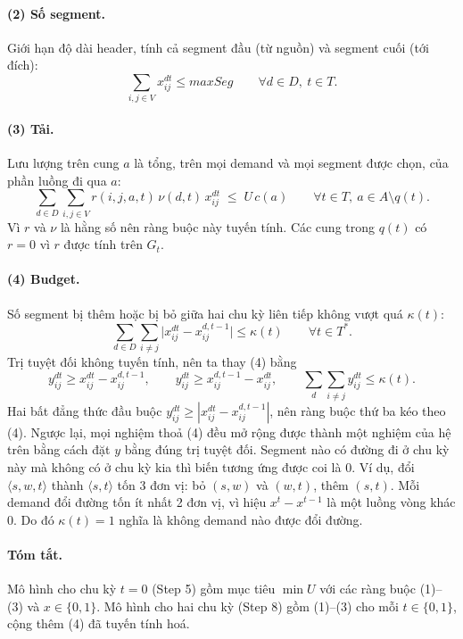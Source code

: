 \documentclass[11pt,a4paper]{article}
\begin{document}
\paragraph{(2) Số segment.} Giới hạn độ dài header, tính cả segment đầu (từ nguồn) và segment cuối (tới đích):
\begin{equation}
\sum_{i,j\in V} x^{dt}_{ij}\le maxSeg\qquad\forall d\in D,\ t\in T.
\end{equation}

\paragraph{(3) Tải.} Lưu lượng trên cung $a$ là tổng, trên mọi demand và mọi segment được chọn, của phần luồng đi qua $a$:
\begin{equation}
\sum_{d\in D}\sum_{i,j\in V} r(i,j,a,t)\,\nu(d,t)\,x^{dt}_{ij}\;\le\; U\,c(a)\qquad\forall t\in T,\ a\in A\setminus q(t).
\end{equation}
Vì $r$ và $\nu$ là hằng số nên ràng buộc này tuyến tính.
Các cung trong $q(t)$ có $r=0$ vì $r$ được tính trên $G_t$.

\paragraph{(4) Budget.} Số segment bị thêm hoặc bị bỏ giữa hai chu kỳ liên tiếp không vượt quá $\kappa(t)$:
\begin{equation}
\sum_{d\in D}\sum_{i\neq j}\bigl|x^{dt}_{ij}-x^{d,t-1}_{ij}\bigr|\le\kappa(t)\qquad\forall t\in T^*.
\end{equation}
Trị tuyệt đối không tuyến tính, nên ta thay (4) bằng
\begin{equation}
y^{dt}_{ij}\ge x^{dt}_{ij}-x^{d,t-1}_{ij},\qquad y^{dt}_{ij}\ge x^{d,t-1}_{ij}-x^{dt}_{ij},\qquad \sum_{d}\sum_{i\neq j}y^{dt}_{ij}\le\kappa(t).
\end{equation}
Hai bất đẳng thức đầu buộc $y^{dt}_{ij}\ge|x^{dt}_{ij}-x^{d,t-1}_{ij}|$, nên ràng buộc thứ ba kéo theo (4).
Ngược lại, mọi nghiệm thoả (4) đều mở rộng được thành một nghiệm của hệ trên bằng cách đặt $y$ bằng đúng trị tuyệt đối.
Segment nào có đường đi ở chu kỳ này mà không có ở chu kỳ kia thì biến tương ứng được coi là $0$.
Ví dụ, đổi $\langle s,w,t\rangle$ thành $\langle s,t\rangle$ tốn 3 đơn vị: bỏ $(s,w)$ và $(w,t)$, thêm $(s,t)$.
Mỗi demand đổi đường tốn ít nhất 2 đơn vị, vì hiệu $x^{t}-x^{t-1}$ là một luồng vòng khác 0.
Do đó $\kappa(t)=1$ nghĩa là không demand nào được đổi đường.

\paragraph{Tóm tắt.}
Mô hình cho chu kỳ $t=0$ (Step 5) gồm mục tiêu $\min U$ với các ràng buộc (1)--(3) và $x\in\{0,1\}$.
Mô hình cho hai chu kỳ (Step 8) gồm (1)--(3) cho mỗi $t\in\{0,1\}$, cộng thêm (4) đã tuyến tính hoá.
\end{document}
